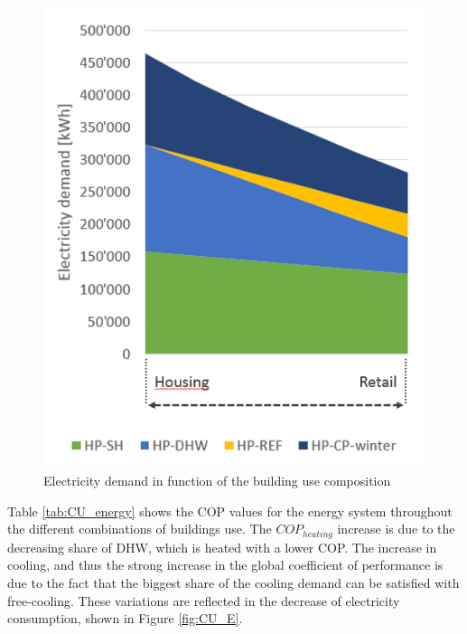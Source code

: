 \documentclass{article}
\begin{document}
\begin{figure}[tph]
	\centering
	\includegraphics[width=0.45\linewidth]{Images/CU_el}
	\caption{Electricity demand in function of the building use composition}
	\label{fig:CU_el}
\end{figure}

Table \ref{tab:CU_energy} shows the COP values for the energy system throughout the different combinations of buildings use. The $COP_{heating}$ increase is due to the decreasing share of DHW, which is heated with a lower COP. The increase in cooling, and thus the strong increase in the global coefficient of performance is due to the fact that the biggest share of the cooling demand can be satisfied with free-cooling. These variations are reflected in the decrease of electricity consumption, shown in Figure \ref{fig:CU_E}.


\end{document}
